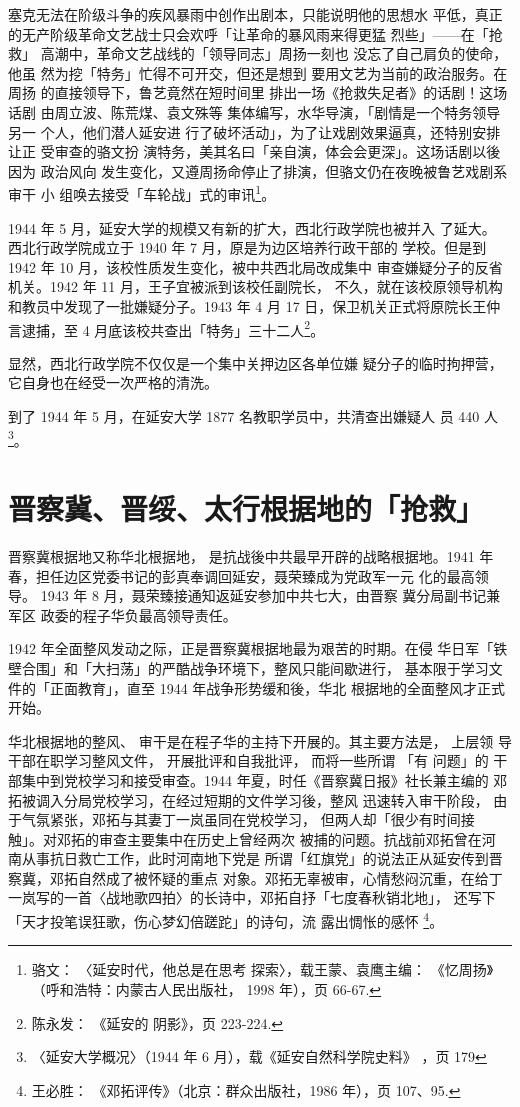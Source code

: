  
塞克无法在阶级斗争的疾风暴雨中创作出剧本，只能说明他的思想水 平低，真正
的无产阶级革命文艺战士只会欢呼「让革命的暴风雨来得更猛 烈些」——在「抢救」
高潮中，革命文艺战线的「领导同志」周扬一刻也 没忘了自己肩负的使命，他虽
然为挖「特务」忙得不可开交，但还是想到 要用文艺为当前的政治服务。在周扬
的直接领导下，鲁艺竟然在短时间里 排出一场《抢救失足者》的话剧！这场话剧
由周立波、陈荒煤、袁文殊等 集体编写，水华导演，「剧情是一个特务领导另一
个人，他们潜人延安进 行了破坏活动」，为了让戏剧效果逼真，还特别安排让正
受审查的骆文扮 演特务，美其名曰「亲自演，体会会更深」。这场话剧以後因为
政治风向 发生变化，又遵周扬命停止了排演，但骆文仍在夜晚被鲁艺戏剧系审干
小 组唤去接受「车轮战」式的审讯\footnote{骆文： 〈延安时代，他总是在思考
探索〉，载王蒙、袁鹰主编： 《忆周扬》（呼和浩特：内蒙古人民出版社，
1998 年），页 66-67.}。

1944 年 5 月，延安大学的规模又有新的扩大，西北行政学院也被并入 了延大。
西北行政学院成立于 1940 年 7 月，原是为边区培养行政干部的 学校。但是到
1942 年 10 月，该校性质发生变化，被中共西北局改成集中 审查嫌疑分子的反省
机关。1942 年 11 月，王子宜被派到该校任副院长， 不久，就在该校原领导机构
和教员中发现了一批嫌疑分子。1943 年 4 月 17 日，保卫机关正式将原院长王仲
言逮捕，至 4 月底该校共查出「特务」三十二人\footnote{陈永发： 《延安的
阴影》，页 223-224.}。

显然，西北行政学院不仅仅是一个集中关押边区各单位嫌
疑分子的临时拘押营，它自身也在经受一次严格的清洗。

到了 1944 年 5 月，在延安大学 1877 名教职学员中，共清查出嫌疑人 员 440
人\footnote{〈延安大学概况〉（1944 年 6 月），载《延安自然科学院史料》
，页 179 }。


\section{晋察冀、晋绥、太行根据地的「抢救」}

晋察冀根据地又称华北根据地， 是抗战後中共最早开辟的战略根据地。1941 年
春，担任边区党委书记的彭真奉调回延安，聂荣臻成为党政军一元 化的最高领导。
1943 年 8 月，聂荣臻接通知返延安参加中共七大，由晋察 冀分局副书记兼军区
政委的程子华负最高领导责任。
 
1942 年全面整风发动之际，正是晋察冀根据地最为艰苦的时期。在侵
华日军「铁壁合围」和「大扫荡」的严酷战争环境下，整风只能间歇进行，
基本限于学习文件的「正面教育」，直至 1944 年战争形势缓和後，华北
根据地的全面整风才正式开始。

华北根据地的整风、 审干是在程子华的主持下开展的。其主要方法是， 上层领
导干部在职学习整风文件， 开展批评和自我批评， 而将一些所谓 「有 问题」的
干部集中到党校学习和接受审查。1944 年夏，时任《晋察冀日报》社长兼主编的
邓拓被调入分局党校学习，在经过短期的文件学习後，整风 迅速转入审干阶段，
由于气氛紧张，邓拓与其妻丁一岚虽同在党校学习， 但两人却「很少有时间接
触」。对邓拓的审查主要集中在历史上曾经两次 被捕的问题。抗战前邓拓曾在河
南从事抗日救亡工作，此时河南地下党是 所谓「红旗党」的说法正从延安传到晋
察冀，邓拓自然成了被怀疑的重点 对象。邓拓无辜被审，心情愁闷沉重，在给丁
一岚写的一首〈战地歌四拍〉的长诗中，邓拓自抒「七度春秋销北地」，
还写下「天才投笔误狂歌，伤心梦幻倍蹉跎」的诗句，流
露出惆怅的感怀 \footnote{王必胜： 《邓拓评传》（北京：群众出版社，1986
年），页 107、95.}。

